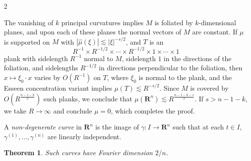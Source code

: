 \documentclass[12pt]{article}
\numberwithin{equation}{section}
\def\R{\mathbf{R}}
\theoremstyle{plain}
\newtheorem*{thm}{Theorem}
\theoremstyle{remark}
\begin{document}
{{\begin{multicols}{2}
{\begin{figure}
\end{figure}


The vanishing of $k$ principal curvatures implies $M$ is foliated by $k$-dimensional planes, and upon each of these planes the normal vectors of $M$ are constant. If $\mu$ is supported on $M$ with $|\widehat{\mu}(\xi)| \lesssim |\xi|^{-s/2}$, and $T$ is an
%
\[ R^{-1} \times R^{-1/2} \times \cdots \times R^{-1/2} \times 1 \times \cdots \times 1 \]
%
plank with sidelength $R^{-1}$ normal to $M$, sidelength $1$ in the directions of the foliation, and sidelengths $R^{-1/2}$ in directions perpendicular to the foliation, then $x \mapsto \xi_0 \cdot x$ varies by $O(R^{-1})$ on $T$, where $\xi_0$ is normal to the plank, and the Esseen concentration variant implies $\mu(T) \lesssim R^{-s/2}$. Since $M$ is covered by $O(R^{\frac{n-1-k}{2}})$ such planks, we conclude that $\mu(\R^n) \lesssim R^{\frac{n-1-k -s}{2}}$. If $s > n - 1 - k$, we take $R \to \infty$ and conclude $\mu = 0$, which completes the proof.
}

\vspace{0.2cm}

{\LARGE A \emph{non-degenerate curve} in $\R^n$ is the image of $\gamma: I \to \R^n$ such that at each $t \in I$, $\gamma^{(1)}, \dots, \gamma^{(n)}$ are linearly independent.

\begin{thm}
    Such curves have Fourier dimension $2/n$.
\end{thm}

\begin{figure}
\end{figure}}
\end{multicols}}}
\end{document}
